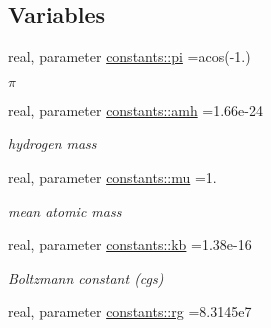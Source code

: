 \subsection*{Variables}
\begin{DoxyCompactItemize}
\item 
\hypertarget{namespaceconstants_a815ad954ef712211ed1b1fdb8be42487}{}real, parameter \hyperlink{namespaceconstants_a815ad954ef712211ed1b1fdb8be42487}{constants\+::pi} =acos(-\/1.)\label{namespaceconstants_a815ad954ef712211ed1b1fdb8be42487}

\begin{DoxyCompactList}\small\item\em $ \pi $ \end{DoxyCompactList}\item 
\hypertarget{namespaceconstants_aac258d92ad409a5ad7f8748101e932b0}{}real, parameter \hyperlink{namespaceconstants_aac258d92ad409a5ad7f8748101e932b0}{constants\+::amh} =1.\+66e-\/24\label{namespaceconstants_aac258d92ad409a5ad7f8748101e932b0}

\begin{DoxyCompactList}\small\item\em hydrogen mass \end{DoxyCompactList}\item 
\hypertarget{namespaceconstants_a02d6877af0064a592565cca791e6dfa2}{}real, parameter \hyperlink{namespaceconstants_a02d6877af0064a592565cca791e6dfa2}{constants\+::mu} =1.\label{namespaceconstants_a02d6877af0064a592565cca791e6dfa2}

\begin{DoxyCompactList}\small\item\em mean atomic mass \end{DoxyCompactList}\item 
\hypertarget{namespaceconstants_afc7b29a52df069e705256c11de562808}{}real, parameter \hyperlink{namespaceconstants_afc7b29a52df069e705256c11de562808}{constants\+::kb} =1.\+38e-\/16\label{namespaceconstants_afc7b29a52df069e705256c11de562808}

\begin{DoxyCompactList}\small\item\em Boltzmann constant (cgs) \end{DoxyCompactList}\item 
\hypertarget{namespaceconstants_aab4c0a2b0e8b8cda79e9d683b3e650f6}{}real, parameter \hyperlink{namespaceconstants_aab4c0a2b0e8b8cda79e9d683b3e650f6}{constants\+::rg} =8.\+3145e7\label{namespaceconstants_aab4c0a2b0e8b8cda79e9d683b3e650f6}


\end{DoxyCompactItemize}
